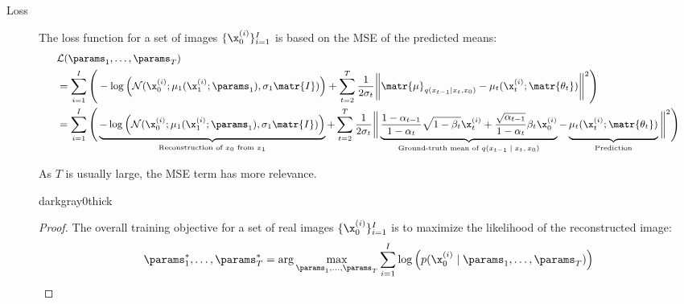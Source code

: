 \begin{description}
        \begin{description}
            \item[Loss]
                The loss function for a set of images $\{ \x_0^{(i)} \}_{i=1}^{I}$ is based on the MSE of the predicted means:
                \[ 
                    \small
                    \begin{split}
                        &\mathcal{L}(\params_1, \dots, \params_T) \\
                        &= \sum_{i=1}^{I}\Bigg( 
                            -\log\left( \mathcal{N}(\x_0^{(i)}; \mu_1(\x_1^{(i)}; \params_1), \sigma_1\matr{I}) \right) +
                            \sum_{t=2}^{T} \frac{1}{2\sigma_t} \bigg\Vert 
                                \matr{\mu}_{q(x_{t-1} \mid x_t, x_0)} -
                                \mu_t(\x_t^{(i)}; \matr{\theta_t}) \vphantom{\frac{\sqrt{0_0}}{0_0}}
                            \bigg\Vert^2
                        \Bigg) \\
                        &= \sum_{i=1}^{I}\Bigg( 
                            \underbrace{-\log\left( \mathcal{N}(\x_0^{(i)}; \mu_1(\x_1^{(i)}; \params_1), \sigma_1\matr{I}) \right)}_{\text{Reconstruction of $x_0$ from $x_1$}} +
                            \sum_{t=2}^{T} \frac{1}{2\sigma_t} \bigg\Vert 
                                \underbrace{\frac{1-\alpha_{t-1}}{1-\alpha_t} \sqrt{1-\beta_t} \x_t^{(i)} + \frac{\sqrt{\alpha_{t-1}}}{1-\alpha_t}\beta_t\x_0^{(i)}}_{\text{Ground-truth mean of $q(x_{t-1} \mid x_t, x_0)$}} -
                                \underbrace{\mu_t(\x_t^{(i)}; \matr{\theta_t}) \vphantom{\frac{\sqrt{0_0}}{0_0}}}_{\text{Prediction}}
                            \bigg\Vert^2
                        \Bigg)
                    \end{split}
                \]

                \begin{remark}
                    As $T$ is usually large, the MSE term has more relevance.
                \end{remark}

                \begin{marginbar}{darkgray}{0}{thick}
                \begin{proof}
                    The overall training objective for a set of real images $\{ \x_0^{(i)} \}_{i=1}^{I}$ is to maximize the likelihood of the reconstructed image:
                    \[ \params_1^*, \dots, \params_T^* = \arg\max_{\params_1, \dots, \params_T} \sum_{i=1}^{I} \log\left( p(\x_0^{(i)} \mid \params_1, \dots, \params_T) \right) \]


\end{proof}
\end{marginbar}
\end{description}
\end{description}
